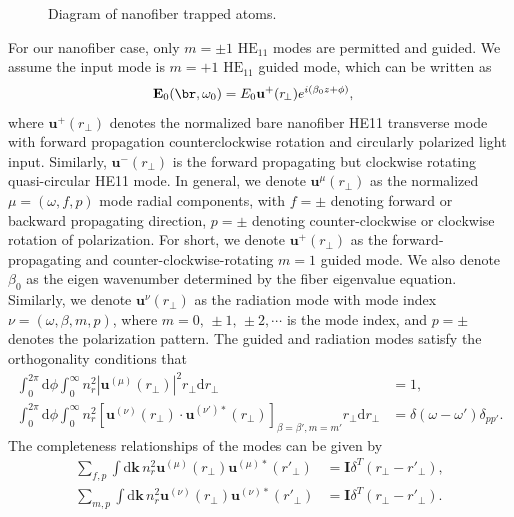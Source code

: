 \documentclass[]{report}
\begin{document}
\begin{figure}
\centering{}
\caption{Diagram of nanofiber trapped atoms. }
\end{figure}

For our nanofiber case, only $ m=\pm 1 $ $ \text{HE}_{11} $ modes are permitted and guided. We assume the input mode is $ m=+1 $ $ \text{HE}_{11} $ guided mode, which can be written as 
\begin{align}
\mathbf{E}_0(\br,\omega_0)&=E_0 \mathbf{u}^+(r\!_\perp ) e^{i(\beta_0 z+\phi)}, 
\end{align}
where $ \mathbf{u}^{+}(r\!_\perp ) $ denotes the normalized bare nanofiber HE11 transverse mode with forward propagation counterclockwise rotation and circularly polarized light input. Similarly, $ \mathbf{u}^{-}(r\!_\perp ) $ is the forward propagating but clockwise rotating quasi-circular HE11 mode. In general, we denote  $ \mathbf{u}^{\mu}(r\!_\perp ) $ as the normalized $\mu=(\omega,f,p)$ mode radial components, with $ f=\pm $ denoting forward or backward propagating direction, $ p=\pm $ denoting counter-clockwise or clockwise rotation of polarization. For short, we denote $\mathbf{u}^+(r\!_\perp )$ as the forward-propagating and counter-clockwise-rotating $m=1$ guided mode. We also denote $ \beta_0 $ as the eigen wavenumber determined by the fiber eigenvalue  equation. Similarly, we denote $ \mathbf{u}^{\nu}(r\!_\perp ) $ as the radiation mode with mode index $ \nu=(\omega,\beta,m,p) $, where $ m=0,\,\pm 1,\,\pm 2,\cdots $ is the mode index, and $p=\pm$ denotes the polarization pattern. The guided and radiation modes satisfy the orthogonality conditions that 
\begin{align}
\int_0^{2\pi}\mathrm{d}\phi \int_0^\infty n_{r}^2|\mathbf{u}^{(\mu)}(r\!_\perp )|^2r\!_\perp \mathrm{d}r\!_\perp &=1,\\
\int_0^{2\pi}\mathrm{d}\phi \int_0^\infty n_{r}^2\left[\mathbf{u}^{(\nu)}(r\!_\perp )\cdot\mathbf{u}^{(\nu')*}(r\!_\perp )\right]_{\beta=\beta',m=m'}r\!_\perp \mathrm{d}r\!_\perp &=\delta(\omega-\omega')\delta_{pp'}.
\end{align}
The completeness relationships of the modes can be given by
\begin{align}
\sum_{f,p}\int \mathrm{d}\mathbf{k} \,n_r^2\mathbf{u}^{(\mu)}(r\!_\perp )\mathbf{u}^{(\mu)*}(r'\!_\perp ) &= \mathbf{I}\delta^T(r\!_\perp-r'\!_\perp),\\
\sum_{m,p}\int \mathrm{d}\mathbf{k} \, n_r^2\mathbf{u}^{(\nu)}(r\!_\perp )\mathbf{u}^{(\nu)*}(r'\!_\perp ) &=\mathbf{I}\delta^T(r\!_\perp-r'\!_\perp).
\end{align}
\end{document}
